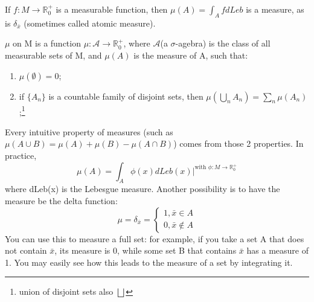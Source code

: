 \begin{example}
    If $f:M\rightarrow\mathbb{R}_0^+$ is a measurable function, then $\mu(A)=\int_A fdLeb$ is a measure, as is $\delta_{\bar{x}}$ (sometimes called atomic measure).
\end{example}

\begin{definition}
    $\mu$ on M is a function $\mu: \mathcal{A\rightarrow \mathbb{R}^+_0}$, where $\mathcal{A}$(a $\sigma$-agebra) is the class of all measurable sets of M, and $\mu(A)$ is the measure of A, such that: \begin{enumerate}
    \item $\mu(\emptyset)=0$;
    \item if $\{A_n\}$ is a countable family of disjoint sets, then $\mu(\bigcup_n A_n)=\sum_{n}\mu(A_n)$;\footnote{union of disjoint sets also $\bigsqcup$}
\end{enumerate}
\end{definition}

Every intuitive property of measures (such as $\mu(A\cup B)=\mu(A)+\mu(B)-\mu(A\cap B)$) comes from those 2 properties. In practice, \begin{equation*}
\mu(A)=\int_A \phi(x) dLeb(x)|^{\text{with }\phi: M\rightarrow \mathbb{R}^+_0}
\end{equation*}
where dLeb(x) is the Lebesgue measure.
Another possibility is to have the measure be the delta function: \begin{equation*}
\mu=\delta_{\bar{x}}= \begin{cases}
    1, \bar{x}\in A \\ 0, \bar{x}\notin A
\end{cases}
\end{equation*}
You can use this to measure a full set: for example, if you take a set A that does not contain $\bar{x}$, its measure is 0, while some set B that contains $\bar{x}$ has a measure of 1. You may easily see how this leads to the measure of a set by integrating it.

